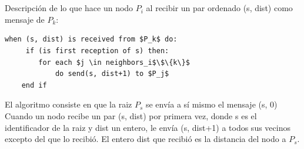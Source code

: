 \documentclass{article}
\begin{document}
\section{}
Descripción de lo que hace un nodo $P_i$ al recibir un par ordenado (s, dist) como mensaje de $P_k$:\\
\begin{lstlisting}
when (s, dist) is received from $P_k$ do:
     if (is first reception of s) then:
        for each $j \in neighbors_i$\$\{k\}$
            do send(s, dist+1) to $P_j$
    end if
\end{lstlisting}


El algoritmo consiste en que la raiz $P_s$ se envía a sí mismo el mensaje (s, 0)\\
Cuando un nodo recibe un par (s, dist) por primera vez, donde s es el identificador de la raiz y dist un entero, le envía (s, dist+1) a todos sus vecinos excepto del que lo recibió. El entero dist que recibió es la distancia del nodo a $P_s$.
    
\end{document}
